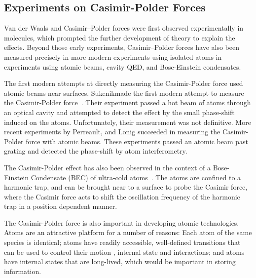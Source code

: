 \subsection{Experiments on Casimir-Polder Forces}

Van der Waals and Casimir--Polder forces were first observed experimentally in molecules, 
which prompted the further development of theory to explain the effects.  
Beyond those early experiments, Casimir--Polder forces have also been measured precisely in more modern experiments  
using isolated atoms in experiments using atomic beams, cavity QED, and Bose-Einstein condensates.  

The first modern attempts at directly measuring the Casimir-Polder force used atomic beams 
near surfaces.  Sukenik\etal made the first modern attempt to measure the Casimir-Polder force~\cite{Sukenik1993}.
Their experiment passed a hot beam of atoms through an optical cavity and attempted to detect
the effect by the small phase-shift induced on the atoms.  Unfortunately, their measurement 
was not definitive.
More recent experiments by Perreault\etal\cite{Perreault2005}, and Lonig\etal\cite{Lonij2009} succeeded in measuring
the Casimir-Polder force with atomic beams.  These experiments passed an atomic beam past grating and 
detected the phase-shift by atom interferometry.  

The Casimir-Polder effect has also been observed in the context of a Bose-Einstein Condensate (BEC)
of ultra-cold atoms~\cite{Harber2005,Obrecht2007}.  %
The atoms are confined to a harmonic trap, and can be brought near to a surface to probe the Casimir
force, where the Casimir force acts to shift the oscillation frequency of the harmonic trap in a position
dependent manner.  %

The Casimir-Polder force is also important in developing atomic technologies.  
Atoms are an attractive platform for a number of reasons:
Each atom of the same species is identical; 
atoms have readily accessible, well-defined transitions that can be used to control their motion
, internal state and interactions; and atoms
have internal states that are long-lived, which would be important in storing information.

